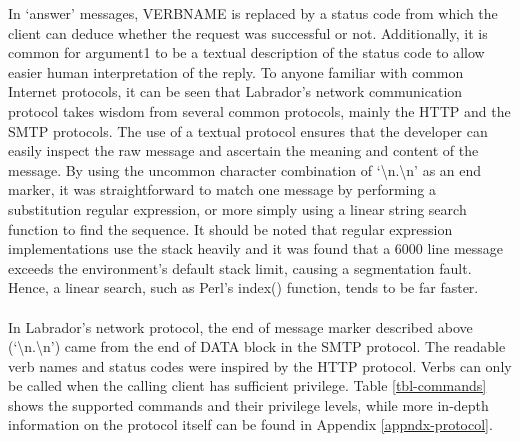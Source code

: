 In `answer' messages, VERBNAME is replaced by a status code from which the client can deduce whether the request was successful or not. Additionally, it is common for argument1 to be a textual description of the status code to allow easier human interpretation of the reply. To anyone familiar with common Internet protocols, it can be seen that Labrador's network communication protocol takes wisdom from several common protocols, mainly the HTTP and the SMTP protocols. The use of a textual protocol ensures that the developer can easily inspect the raw message and ascertain the meaning and content of the message. By using the uncommon character combination of `\textbackslash n.\textbackslash n' as an end marker, it was straightforward to match one message by performing a substitution regular expression, or more simply using a linear string search function to find the sequence. It should be noted that regular expression implementations use the stack heavily and it was found that a 6000 line message exceeds the environment's default stack limit, causing a segmentation fault. Hence, a linear search, such as Perl's index() function, tends to be far faster.\\
\ \\
In Labrador's network protocol, the end of message marker described above (`\textbackslash n.\textbackslash n') came from the end of DATA block in the SMTP protocol\cite{rfc821}. The readable verb names and status codes were inspired by the HTTP protocol\cite{rfc2616}. Verbs can only be called when the calling client has sufficient privilege. Table \ref{tbl-commands} shows the supported commands and their privilege levels, while more in-depth information on the protocol itself can be found in Appendix \ref{appndx-protocol}.


